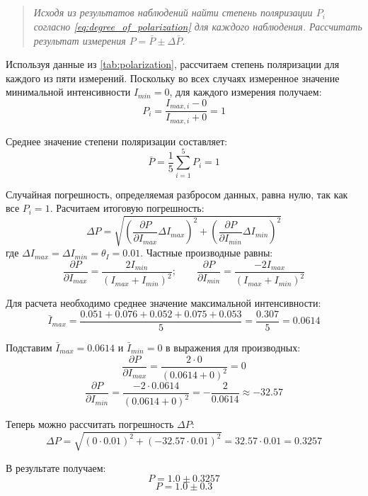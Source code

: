 \subsection*{  }
\begin{quote}
    \textit{Исходя из результатов наблюдений найти степень поляризации $P_i$ согласно \cref{eq:degree_of_polarization} для каждого наблюдения. Рассчитать результат измерения $P = \bar{P} \pm \Delta \bar{P}$.}
\end{quote}

Используя данные из \cref{tab:polarization}, рассчитаем степень поляризации для каждого из пяти измерений. Поскольку во всех случаях измеренное значение минимальной интенсивности $I_{min} = 0$, для каждого измерения получаем:
$$
P_i = \frac{I_{max, i} - 0}{I_{max, i} + 0} = 1
$$

Среднее значение степени поляризации составляет:
$$
\bar{P} = \frac{1}{5}\sum_{i=1}^{5} P_i = 1
$$

Случайная погрешность, определяемая разбросом данных, равна нулю, так как все $P_i = 1$. Расчитаем итоговую погрешность:
$$
\Delta P = \sqrt{ \left( \frac{\partial P}{\partial I_{max}} \Delta I_{max} \right)^2 + \left( \frac{\partial P}{\partial I_{min}} \Delta I_{min} \right)^2 }
$$
где $\Delta I_{max} = \Delta I_{min} = \theta_I = 0.01$. Частные производные равны:
$$
\frac{\partial P}{\partial I_{max}} = \frac{2 I_{min}}{(I_{max} + I_{min})^2}; \qquad \frac{\partial P}{\partial I_{min}} = \frac{-2 I_{max}}{(I_{max} + I_{min})^2}
$$

Для расчета необходимо среднее значение максимальной интенсивности:
$$
\bar{I}_{max} = \frac{0.051 + 0.076 + 0.052 + 0.075 + 0.053}{5} = \frac{0.307}{5} = 0.0614
$$

Подставим $\bar{I}_{max} = 0.0614$ и $\bar{I}_{min} = 0$ в выражения для производных:
$$
\frac{\partial P}{\partial I_{max}} = \frac{2 \cdot 0}{(0.0614 + 0)^2} = 0
$$
$$
\frac{\partial P}{\partial I_{min}} = \frac{-2 \cdot 0.0614}{(0.0614 + 0)^2} = -\frac{2}{0.0614} \approx -32.57
$$

Теперь можно рассчитать погрешность $\Delta P$:
$$
\Delta P = \sqrt{ (0 \cdot 0.01)^2 + (-32.57 \cdot 0.01)^2 } = 32.57 \cdot 0.01 = 0.3257
$$

В результате получаем:
$$
P = 1.0 \pm 0.3257
$$
$$
P = 1.0 \pm 0.3
$$

\begin{flushright}
\end{flushright}



